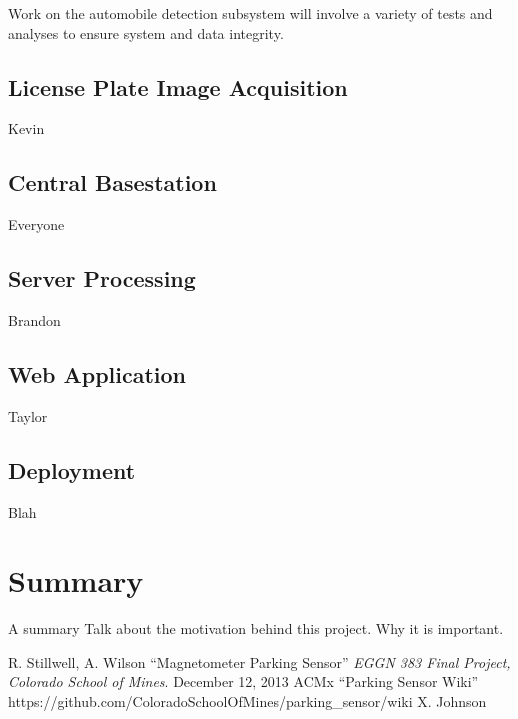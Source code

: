 \documentclass[11pt, oneside, fullpage, doublespace]{article}
\begin{document}
Work on the automobile detection subsystem will involve a variety of tests and analyses to ensure system and data integrity.


\subsection{License Plate Image Acquisition}
Kevin


\subsection{Central Basestation}
Everyone


\subsection{Server Processing}
Brandon


\subsection{Web Application}
Taylor


\subsection{Deployment}
Blah


\section{Summary}
A summary \cite{johnson2012} Talk about the motivation behind this project. Why it is important.


\begin{thebibliography}{99}
 R. Stillwell, A. Wilson ``Magnetometer Parking Sensor'' \emph{EGGN 383 Final Project, Colorado School of Mines}. December 12, 2013
  ACMx ``Parking Sensor Wiki'' https://github.com/ColoradoSchoolOfMines/parking_sensor/wiki %
 X. Johnson
\end{thebibliography}
\end{document}
